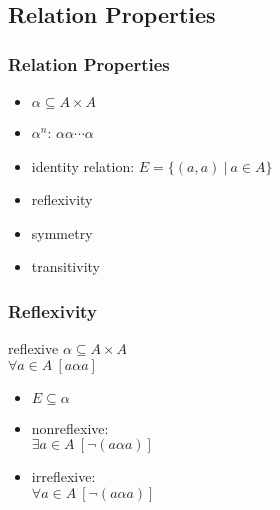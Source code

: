 \documentclass[dvipsnames]{beamer}
\begin{document}
\subsection{Relation Properties}

\begin{frame}
  \frametitle{Relation Properties}

  \begin{itemize}
    \item $\alpha \subseteq A \times A$
    \item $\alpha^n$: $\alpha \alpha \cdots \alpha$
    \item \alert{identity relation}: $E = \{(a,a)~|~a \in A\}$

    \pause
    \bigskip
    \item reflexivity
    \item symmetry
    \item transitivity
  \end{itemize}
\end{frame}

\begin{frame}
  \frametitle{Reflexivity}

  \begin{block}{reflexive}
    $\alpha \subseteq A \times A$\\
    $\forall a \in A~[a \alpha a]$
  \end{block}

  \pause
  \begin{itemize}
    \item $E \subseteq \alpha$

    \pause
    \item nonreflexive:\\
      $\exists a \in A~[\neg (a \alpha a)]$

    \pause
    \item irreflexive:\\
      $\forall a \in A~[\neg (a \alpha a)]$
  \end{itemize}
\end{frame}
\end{document}
